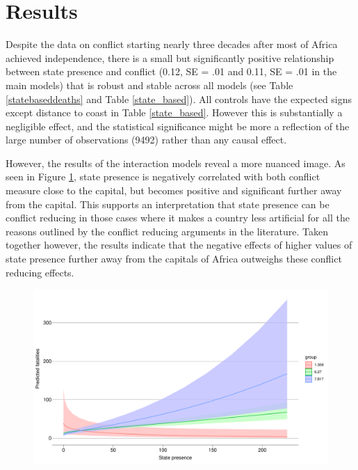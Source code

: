 \documentclass[12pt]{article}
\begin{document}
\section{Results}

Despite the data on conflict starting nearly three decades after most of Africa
achieved independence, there is a small but significantly positive relationship
between state presence and conflict (0.12, SE = .01 and 0.11, SE = .01 in the
main models) that is robust and stable across all models (see Table
\ref{statebaseddeaths} and Table \ref{state_based}). All controls have the
expected signs except distance to coast in Table \ref{state_based}. However this
is substantially a negligible effect, and the statistical significance might be
more a reflection of the large number of observations (9492) rather than any
causal effect.

However, the results of the interaction models reveal a more nuanced image. As
seen in Figure \ref{deaths_int}, state presence is negatively correlated with
both conflict measure close to the capital, but becomes positive and significant
further away from the capital. This supports an interpretation that state
presence can be conflict reducing in those cases where it makes a country less
artificial for all the reasons outlined by the conflict reducing arguments in
the literature. Taken together however, the results indicate that the negative
effects of higher values of state presence further away from the capitals of
Africa outweighs these conflict reducing effects. 


\begin{figure}[htpb]
	\centering
	\includegraphics[width=\linewidth]{"../R/Output/deathsIntPlot.pdf"}
	\caption{}
	\label{deaths_int}
\end{figure}
\end{document}
